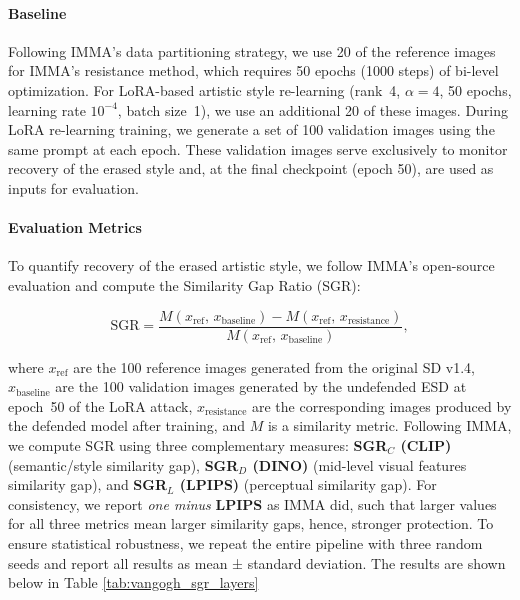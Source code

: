 \documentclass{article}
\theoremstyle{plain}
\theoremstyle{definition}
\theoremstyle{remark}
\begin{document}
\paragraph{Baseline} Following IMMA's data partitioning strategy, we use 20 of the reference images for IMMA's resistance method, which requires 50 epochs (1000 steps) of bi-level optimization. For LoRA-based artistic style re-learning (rank~4, $\alpha=4$, 50 epochs, learning rate $10^{-4}$, batch size~1), we use an additional 20 of these images. During LoRA re-learning training, we generate a set of 100 validation images using the same prompt at each epoch. These validation images serve exclusively to monitor recovery of the erased style and, at the final checkpoint (epoch 50), are used as inputs for evaluation. 

\paragraph{Evaluation Metrics} To quantify recovery of the erased artistic style, we follow IMMA’s open-source evaluation and compute the Similarity Gap Ratio (SGR):

\[
\text{SGR} =
\frac{M(x_{\text{ref}},\, x_{\text{baseline}})
      - M(x_{\text{ref}},\, x_{\text{resistance}})}
     {M(x_{\text{ref}},\, x_{\text{baseline}})},
\]

where $x_{\text{ref}}$ are the 100 reference images generated from the original SD v1.4, $x_{\text{baseline}}$ are the 100 validation images generated by the undefended ESD at epoch~50 of the LoRA attack, $x_{\text{resistance}}$ are the corresponding images produced by the defended model after training, and $M$ is a similarity metric. Following IMMA, we compute SGR using three complementary measures: \textbf{SGR$_C$ (CLIP)} (semantic/style similarity gap), \textbf{SGR$_D$ (DINO)} (mid-level visual features similarity gap), and \textbf{SGR$_L$ (LPIPS)} (perceptual similarity gap). For consistency, we report \textit{one minus} \textbf{LPIPS} as IMMA did, such that larger values for all three metrics mean larger similarity gaps, hence, stronger protection. To ensure 
statistical robustness, we repeat the entire pipeline with three random seeds and report all results as mean ± standard deviation. The results are shown below in Table \ref{tab:vangogh_sgr_layers}
\end{document}
